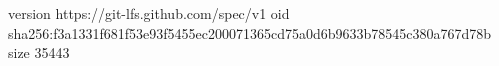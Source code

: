 version https://git-lfs.github.com/spec/v1
oid sha256:f3a1331f681f53e93f5455ec200071365cd75a0d6b9633b78545c380a767d78b
size 35443
